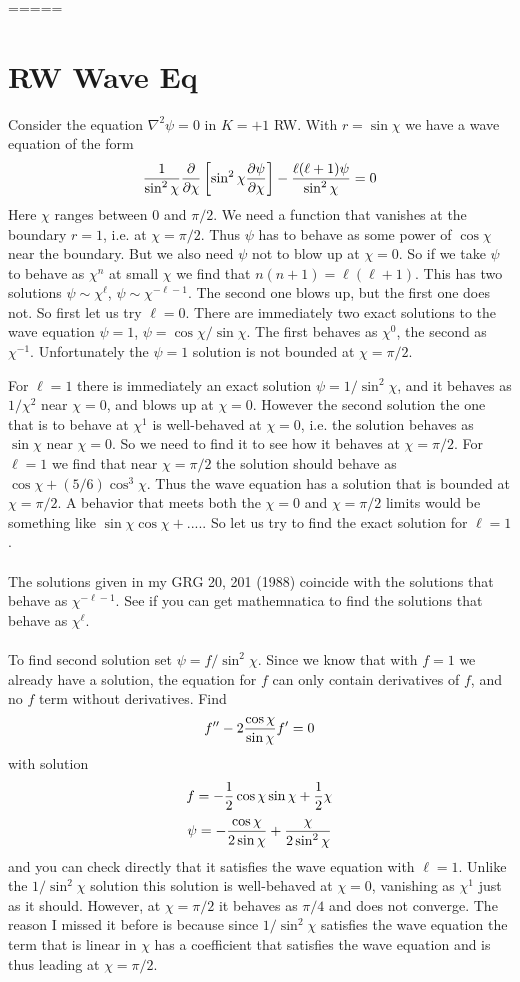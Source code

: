 \documentclass[10pt,letterpaper]{article}
\numberwithin{equation}{section}
\begin{document}
=====
\newpage
\section{RW Wave Eq}
Consider the equation $\nabla^2\psi=0$ in $K=+1$ RW. With $r=\sin\chi$ we have a wave equation of the form 
%
$${1 \over \sin^2\chi}{\partial \over \partial \chi}\left[\sin^2\chi{\partial \psi\over \partial \chi}\right]-{\ell(\ell+1)\psi\over \sin^2\chi}=0$$
%
Here $\chi$ ranges between $0$ and $\pi/2$. We need a function that vanishes at the boundary $r=1$, i.e. at $\chi=\pi/2$. Thus $\psi$ has to behave as some power of $\cos\chi$ near the boundary. But we also need $\psi$ not to blow up at $\chi=0$. So if we take $\psi$ to behave as $\chi^n$ at small $\chi$ we find that $n(n+1)=\ell(\ell+1)$. This has two solutions $\psi \sim \chi^{\ell}$, $\psi \sim \chi^{-\ell-1}$. The second one blows up, but  the first one does not. So first let us try $\ell=0$. There are immediately two exact solutions to the wave equation $\psi=1$, $\psi=\cos\chi/\sin\chi$. The first behaves as $\chi^0$, the second as $\chi^{-1}$. Unfortunately the $\psi=1$ solution is not bounded at $\chi=\pi/2$. 

For $\ell=1$ there is immediately an exact  solution $\psi=1/\sin^2\chi$, and it behaves as $1/\chi^2$ near $\chi=0$, and blows up at $\chi=0$. However the second solution the one that is to behave at $\chi^1$ is well-behaved at $\chi=0$, i.e. the  solution behaves as $\sin\chi$ near $\chi=0$. So we need to find it to see how it behaves at $\chi=\pi/2$. For $\ell=1$ we find that near $\chi=\pi/2$ the solution should behave as $\cos\chi+(5/6)\cos^3\chi$. Thus the wave equation has a solution that is bounded at $\chi=\pi/2$. A behavior that meets both the $\chi=0$ and $\chi=\pi/2$ limits would be something like $\sin\chi\cos\chi+....$. So let us try to find the exact solution for $\ell=1$.
\\ 
\\
The solutions given in my GRG 20, 201 (1988) coincide with the solutions that behave as $\chi^{-\ell-1}$. See if you can get mathemnatica to find the solutions that behave as $\chi^{\ell}$.
\\ \\
To find second solution set $\psi=f/\sin^2\chi$. Since we know that with $f=1$ we already have a solution, the equation for $f$ can only contain derivatives of $f$, and no $f$ term without derivatives. Find
%
$$f^{\prime\prime}-2{\cos\chi \over \sin\chi}f^{\prime}=0$$ 
%
with solution
%
$$f=-{1 \over 2}\cos\chi\sin\chi+{1\over 2}\chi$$
%
%
$$\psi=-{\cos\chi \over 2\sin\chi}+{\chi\over 2\sin^2\chi}$$
%
and you can check directly that it satisfies the wave equation with $\ell=1$. Unlike the $1/\sin^2\chi$ solution this solution is well-behaved at $\chi=0$, vanishing as $\chi^1$ just as it should. However, at $\chi=\pi/2$ it behaves as $\pi/4$ and does not converge. The reason I missed it before is because since $1/\sin^2\chi$ satisfies the wave equation the term that is linear in $\chi$ has a coefficient that satisfies the wave equation and is thus leading at $\chi=\pi/2$.
\end{document}
